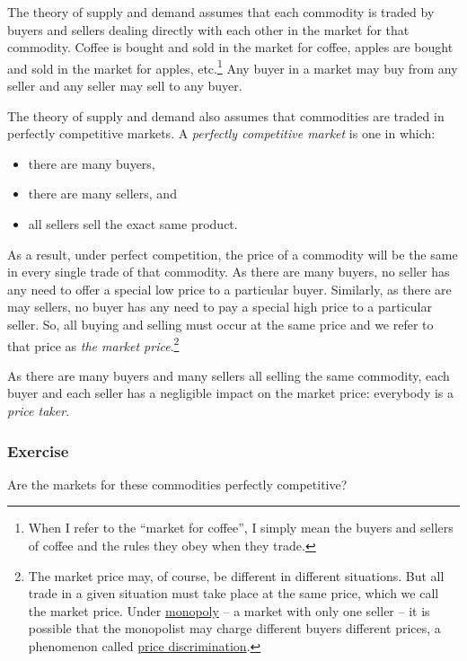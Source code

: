 \documentclass[
  letterpaper,
]{book}
\providecommand{\tightlist}{%
  \setlength{\itemsep}{0pt}\setlength{\parskip}{0pt}}\usepackage{longtable,booktabs,array}
\begin{document}
The theory of supply and demand assumes that each commodity is traded by
buyers and sellers dealing directly with each other in the market for
that commodity. Coffee is bought and sold in the market for coffee,
apples are bought and sold in the market for apples, etc.\footnote{When
  I refer to the ``market for coffee'', I simply mean the buyers and
  sellers of coffee and the rules they obey when they trade.} Any buyer
in a market may buy from any seller and any seller may sell to any
buyer.

The theory of supply and demand also assumes that commodities are traded
in perfectly competitive markets. A \emph{perfectly competitive market}
is one in which:

\begin{itemize}
\tightlist
\item
  there are many buyers,
\item
  there are many sellers, and
\item
  all sellers sell the exact same product.
\end{itemize}

As a result, under perfect competition, the price of a commodity will be
the same in every single trade of that commodity. As there are many
buyers, no seller has any need to offer a special low price to a
particular buyer. Similarly, as there are may sellers, no buyer has any
need to pay a special high price to a particular seller. So, all buying
and selling must occur at the same price and we refer to that price as
\emph{the market price}.\footnote{The market price may, of course, be
  different in different situations. But all trade in a given situation
  must take place at the same price, which we call the market price.
  Under \href{https://en.wikipedia.org/wiki/Monopoly}{monopoly} -- a
  market with only one seller -- it is possible that the monopolist may
  charge different buyers different prices, a phenomenon called
  \href{https://en.wikipedia.org/wiki/Price_discrimination}{price
  discrimination}.}

As there are many buyers and many sellers all selling the same
commodity, each buyer and each seller has a negligible impact on the
market price: everybody is a \emph{price taker}.

\subsubsection{Exercise}\label{exercise}

Are the markets for these commodities perfectly competitive?
\end{document}
